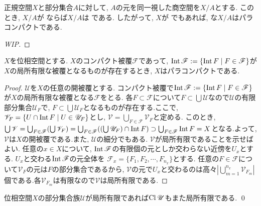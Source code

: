 \documentclass[uplatex, dvipdfmx, a4paper, 12pt, class=jsbook, crop=false]{standalone}
\begin{document}
\begin{proposition}
	正規空間$ X $と部分集合$ A $に対して, $ A $の元を同一視した商空間を$ X / A $とする. このとき, $ X / A $が  ならば$ X / A $は  である. したがって, $ X $が \Lindelof でもあれば, な$ X / A $はパラコンパクトである.
\end{proposition}
\begin{proof}
	[WIP]
\end{proof}

\begin{proposition}
	\label{prop:existence of a compact covering whose interior is a locally finite covering>ParaCpt}
	$ X $を位相空間とする. $ X $のコンパクト被覆$\mathscr{F}$であって, $\topint \mathscr{F} \defeq \setcomp{\topint F}{F \in \mathscr{F}}$が$X$の局所有限な被覆となるものが存在するとき, $ X $はパラコンパクトである.
\end{proposition}

\begin{proof}
	$ \mathscr{U} $を$ X $の任意の開被覆とする. コンパクト被覆で$\topint\mathscr{F} \defeq \setcomp{\topint F}{F \in \mathscr{F}}$が$ X $の局所有限な被覆となる$ \mathscr{F} $をとる. 各$ F \subset \mathscr{F} $について$ F \subset \bigcup \mathscr{U} $なので$ \mathscr{U} $の有限部分集合$ \mathscr{U}_F  $で, $ F \subset \bigcup \mathscr{U}_F $となるものが存在する.ここで, $ \mathscr{V}_F = \setcomp{U \cap \topint F}{U \in \mathscr{U}_F}$とし, $ \mathscr{V} = \bigcup_{F \in \mathscr{F}} \mathscr{V}_F $と定める. このとき, $ \bigcup \mathscr{V}=\bigcup_{F\in\mathscr{F}}(\bigcup \mathscr{V}_F) = \bigcup_{F\in \mathscr{F}}((\bigcup \mathscr{U}_F) \cap \mathop{\mathrm{Int}}\nolimits F) \supset \bigcup_{F\in\mathscr{F}}\mathop{\mathrm{Int}}\nolimits F = X $となる.よって, $ \mathscr{V} $は$ X $の開被覆である.また, $ \mathscr{U} $の細分でもある. $ \mathscr{V} $が局所有限であることを示せばよい. 任意の$ x \in X $について, $ \mathop{\mathrm{Int}}\nolimits \mathscr{F} $の有限個の元としか交わらない近傍を$U_x$とする. $ U_x $と交わる$ \mathop{\mathrm{Int}}\nolimits \mathscr{F} $の元全体を
	$ \mathscr{F}_x = \{F_{1}, F_{2} ,\cdots, F_{n_x}\} $とする. 任意の$ F \in \mathscr{F} $について$ \mathscr{V}_F $の元は$ F $の部分集合であるから, $ \mathscr{V} $の元で$ U_x $と交わるのは高々$ |\bigcup_{m=1}^{n_x} \mathscr{V}_{F_m}| $個である.各$ \mathscr{V}_{F_m} $は有限なので$ \mathscr{V} $は局所有限である.
\end{proof}

\begin{lemma}
	\label{lem:every closure of any locally finite family of subsets is locally finite}
	位相空間$ X $の部分集合族$ \mathscr{U} $が局所有限であれば$ \mathop{\mathrm{Cl}}\nolimits \mathscr{U} $もまた局所有限である. \qed
\end{lemma}
\end{document}

